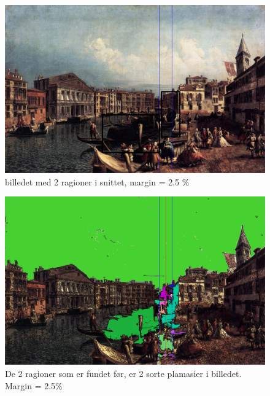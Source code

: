\begin{figure}[h!!]
	\begin{center}
		\includegraphics[scale=0.40,angle=0]{afsnit/afprovning/billeder/BBcomposa.png}
	\end{center}
	\caption[]{billedet med 2 ragioner i snittet, margin = 2.5 \%}
	\label{BBcomposa}
\end{figure}

\begin{figure}[h!!]
	\begin{center}
		\includegraphics[scale=0.40,angle=0]{afsnit/afprovning/billeder/FFcomposa.png}
	\end{center}
	\caption[]{De 2 ragioner som er fundet før, er 2 sorte plamasier i
	billedet. Margin = 2.5\%}
	\label{FFcomposa}
\end{figure}

